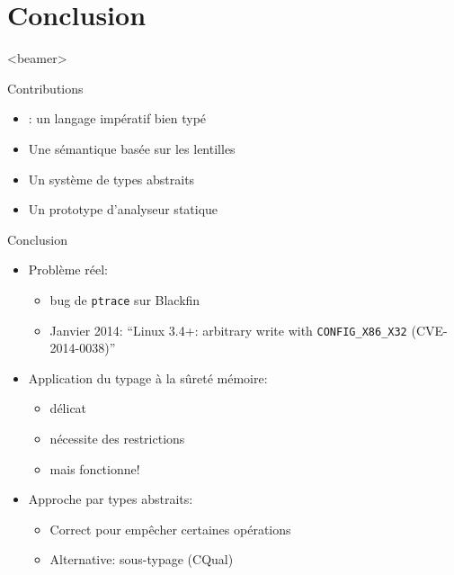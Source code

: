 \section{Conclusion}
  \begin{frame}<beamer>
   \tableofcontents[currentsection]
 \end{frame}


\begin{frame}{Contributions}
\begin{itemize}
\item \langname: un langage impératif bien typé
\item Une sémantique basée sur les lentilles
\item Un système de types abstraits
\item Un prototype d'analyseur statique
\end{itemize}
\end{frame}

\begin{frame}{Conclusion}
    \begin{itemize}
    \item Problème réel:
        \begin{itemize}
            \item bug de \texttt{ptrace} sur Blackfin
            \item Janvier 2014:
                \enquote{Linux 3.4+: arbitrary write with \texttt{CONFIG\_X86\_X32} (CVE-2014-0038)}
        \end{itemize}
    \item Application du typage à la sûreté mémoire:
        \begin{itemize}
            \item délicat
            \item nécessite des restrictions
            \item mais fonctionne!
        \end{itemize}
    \item Approche par types abstraits:
        \begin{itemize}
            \item Correct pour empêcher certaines opérations
            \item Alternative: sous-typage (CQual)
        \end{itemize}
    \end{itemize}
\end{frame}

